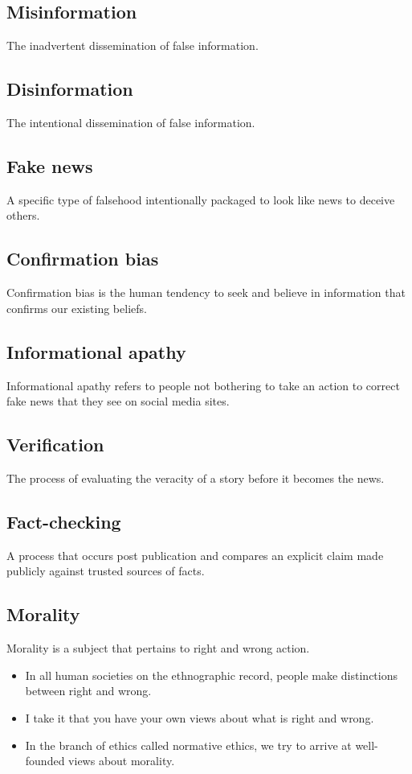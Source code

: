 \documentclass[11pt]{article}
\begin{document}
\subsection{Misinformation}
\label{sec:org73cbdd4}
The inadvertent dissemination of false information.

\subsection{Disinformation}
\label{sec:org7f2b5d7}
The intentional dissemination of false information.

\subsection{Fake news}
\label{sec:org130581e}
A specific type of falsehood intentionally packaged to look like news to deceive others.

\subsection{Confirmation bias}
\label{sec:org1b66324}
Confirmation bias is the human tendency to seek and believe in information that confirms our existing beliefs.

\subsection{Informational apathy}
\label{sec:org7f2162d}
Informational apathy refers to people not bothering to take an action to correct fake news that they see on social media sites.

\subsection{Verification}
\label{sec:org20a3a15}
The process of evaluating the veracity of a story before it becomes the news.

\subsection{Fact-checking}
\label{sec:orga6f943f}
A process that occurs post publication and compares an explicit claim made publicly against trusted sources of facts.

\subsection{Morality}
\label{sec:org7f16657}
Morality is a subject that pertains to right and wrong action.
\begin{itemize}
\item In all human societies on the ethnographic record, people make distinctions between right and wrong.
\item I take it that you have your own views about what is right and wrong.
\item In the branch of ethics called normative ethics, we try to arrive at well-founded views about morality.
\end{itemize}
\end{document}
